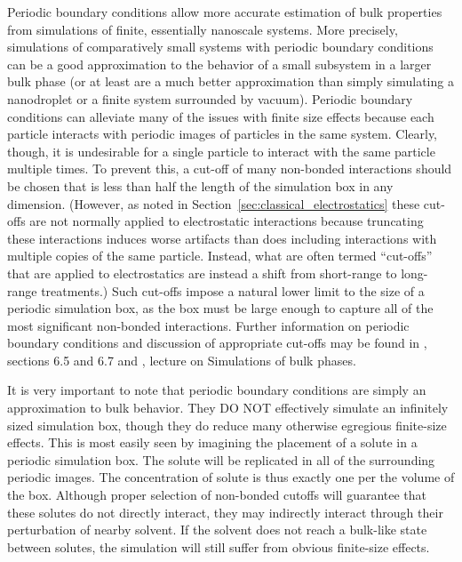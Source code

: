 \documentclass[9pt,bestpractices]{livecoms}
\begin{document}
Periodic boundary conditions allow more accurate estimation of bulk properties from simulations of finite, essentially nanoscale systems.
More precisely, simulations of comparatively small systems with periodic boundary conditions can be a good approximation to the behavior of a small subsystem in a larger bulk phase (or at least are a much better approximation than simply simulating a nanodroplet or a finite system surrounded by vacuum).
Periodic boundary conditions can alleviate many of the issues with finite size effects because each particle interacts with periodic images of particles in the same system.
Clearly, though, it is undesirable for a single particle to interact with the same particle multiple times.
To prevent this, a cut-off of many non-bonded interactions should be chosen that is less than half the length of the simulation box in any dimension.
(However, as noted in Section~\ref{sec:classical_electrostatics} these cut-offs are not normally applied to electrostatic interactions because truncating these interactions induces worse artifacts than does including interactions with multiple copies of the same particle. 
Instead, what are often termed ``cut-offs'' that are applied to electrostatics are instead a shift from short-range to long-range treatments.)
Such cut-offs impose a natural lower limit to the size of a periodic simulation box, as the box must be large enough to capture all of the most significant non-bonded interactions.
Further information on periodic boundary conditions and discussion of appropriate cut-offs may be found in \citet{LeachBook}, sections 6.5 and 6.7 and \citet{ShellNotes}, lecture on Simulations of bulk phases.

It is very important to note that periodic boundary conditions are simply an approximation to bulk behavior.
They DO NOT effectively simulate an infinitely sized simulation box, though they do reduce many otherwise egregious finite-size effects.
This is most easily seen by imagining the placement of a solute in a periodic simulation box.
The solute will be replicated in all of the surrounding periodic images.
The concentration of solute is thus exactly one per the volume of the box.
Although proper selection of non-bonded cutoffs will guarantee that these solutes do not directly interact, they may indirectly interact through their perturbation of nearby solvent.
If the solvent does not reach a bulk-like state between solutes, the simulation will still suffer from obvious finite-size effects.
\end{document}

